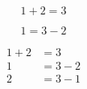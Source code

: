 \documentclass{article}
\begin{document}
	\begin{equation*}
		1 + 2 = 3 
	\end{equation*}

	\begin{equation*}
		1 = 3 - 2
	\end{equation*}

	\begin{align*}		%
	  1 + 2 &= 3\\		%
	  1 &= 3 - 2\\
	  2 &= 3 - 1
	\end{align*}
\end{document}
